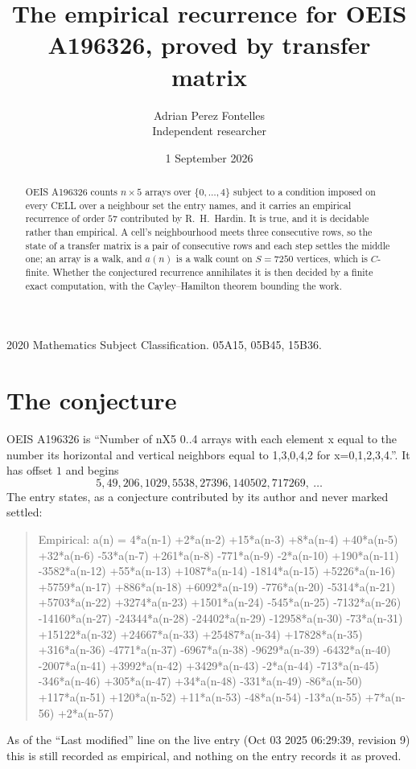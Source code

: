 \documentclass[11pt,a4paper]{article}
\title{The empirical recurrence for OEIS A196326, proved by transfer matrix}
\author{Adrian Perez Fontelles\\ \small Independent researcher}
\date{1 September 2026}
\theoremstyle{plain}
\theoremstyle{definition}
\begin{document}
\maketitle

\begin{abstract}
OEIS A196326 counts $n\times5$ arrays over $\{0,\dots,4\}$ subject to a condition imposed on
every CELL over a neighbour set the entry names, and it carries an empirical recurrence of
order $57$ contributed by R.~H.~Hardin. It is true, and it is decidable rather than
empirical. A cell's neighbourhood meets three consecutive rows, so the state of a transfer
matrix is a pair of consecutive rows and each step settles the middle one; an array is a
walk, and $a(n)$ is a walk count on $S=7250$ vertices, which is $C$-finite. Whether the
conjectured recurrence annihilates it is then decided by a finite exact computation, with the
Cayley--Hamilton theorem bounding the work.
\end{abstract}

\noindent\small 2020 Mathematics Subject Classification. 05A15, 05B45, 15B36.\normalsize

\section{The conjecture}

OEIS A196326 is ``Number of nX5 0..4 arrays with each element x equal to the number its horizontal and vertical neighbors equal to 1,3,0,4,2 for x=0,1,2,3,4.''. It has offset $1$ and begins
\[
5, 49, 206, 1029, 5538, 27396, 140502, 717269,\ \dots
\]
The entry states, as a conjecture contributed by its author and never marked settled:
\begin{quote}
Empirical: a(n) = 4*a(n-1) +2*a(n-2) +15*a(n-3) +8*a(n-4) +40*a(n-5) +32*a(n-6) -53*a(n-7) +261*a(n-8) -771*a(n-9) -2*a(n-10) +190*a(n-11) -3582*a(n-12) +55*a(n-13) +1087*a(n-14) -1814*a(n-15) +5226*a(n-16) +5759*a(n-17) +886*a(n-18) +6092*a(n-19) -776*a(n-20) -5314*a(n-21) +5703*a(n-22) +3274*a(n-23) +1501*a(n-24) -545*a(n-25) -7132*a(n-26) -14160*a(n-27) -24344*a(n-28) -24402*a(n-29) -12958*a(n-30) -73*a(n-31) +15122*a(n-32) +24667*a(n-33) +25487*a(n-34) +17828*a(n-35) +316*a(n-36) -4771*a(n-37) -6967*a(n-38) -9629*a(n-39) -6432*a(n-40) -2007*a(n-41) +3992*a(n-42) +3429*a(n-43) -2*a(n-44) -713*a(n-45) -346*a(n-46) +305*a(n-47) +34*a(n-48) -331*a(n-49) -86*a(n-50) +117*a(n-51) +120*a(n-52) +11*a(n-53) -48*a(n-54) -13*a(n-55) +7*a(n-56) +2*a(n-57)
\end{quote}
As of the ``Last modified'' line on the live entry (Oct 03 2025 06:29:39, revision 9) this is still
recorded as empirical, and nothing on the entry records it as proved.
\end{document}
